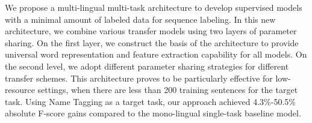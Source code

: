 We propose a multi-lingual multi-task architecture to develop supervised models with a minimal amount of labeled data for sequence labeling. In this new architecture, we combine various transfer models using two layers of parameter sharing. On the first layer, we construct the  basis of the architecture to provide universal word representation and feature extraction capability for all models. On the second level, we adopt different parameter sharing strategies for different transfer schemes. This architecture proves to be particularly effective for low-resource settings, when there are less than 200 training sentences for the target task. Using Name Tagging as a target task, our approach achieved 4.3\%-50.5\% absolute F-score gains compared to the mono-lingual single-task baseline model.
